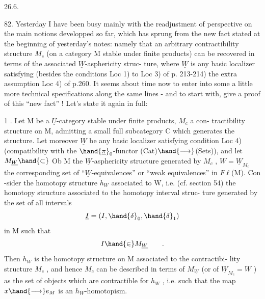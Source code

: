 
26.6.

82. Yesterday I have been busy mainly with the readjustment of  
perspective on the main notions developped so far, which has sprung from
the new fact stated at the beginning of yesterday's notes: namely that an
arbitrary contractibility structure $M_c$ (on a category M stable under finite
products) can be recovered in terms of the associated $\underline{W}$-asphericity struc-%
ture, where $\underline{W}$ is any basic localizer satisfying (besides the conditions
Loc 1) to Loc 3) of p. 213-214) the extra assumption Loc 4) of p.260. It
seems about time now to enter into some  a little more technical
specifications along the same lines - and to start with, give a proof
of this ``new fact'' ! Let's state it again in full:

\hand{\uline{\textcolor{black}{Theorem}}} 1 . Let M be a $\underline{U}$-category stable under finite products, $M_c$  a con-%
tractibility structure on M, admitting a small full subcategory C which
generates the structure. Let moreover $\underline{W}$ be any basic localizer satisfying
condition Loc 4) (compatibility with the $\hand{\underline{\pi}}_0$-functor (Cat)$\hand{\longrightarrow}$(Sets)), and
let $M_{\underline{W}} \hand{\subset}$ Ob M the $\underline{W}$-asphericity structure generated by $M_c$ , $W = \underline{W}_{M_c}$ the
corresponding set of ``$\underline{W}$-equivalences'' or ``weak equivalences'' in $F\ell$(M). Con%
-sider the homotopy structure $h_W$ associated to W, i.e. (cf. section 54)
the homotopy  structure associated to the homotopy interval struc-%
ture  generated by the set  of all intervals
\[ \underline{I} = (I, \hand{\delta}_0, \hand{\delta}_1) \]
in M such that
\[ I \hand{\in} M_{\underline{W}} \qquad . \]
Then $h_W$  is the homotopy structure on M associated to the contractibi-%
lity structure $M_c$ , and hence $M_c$ can be described in terms of $M_{\underline{W}}$ (or of
$\underline{W}_{M_c} = W$ ) as the set of objects which are contractible for $h_W$ , i.e. such
that the map $x \hand{\longrightarrow} e_M$ is an $h_W$-homotopism.


